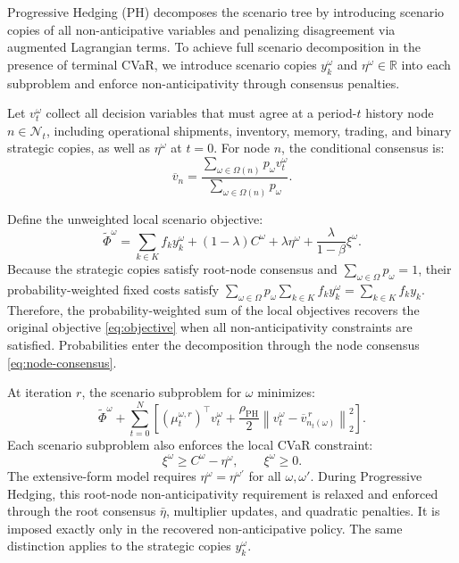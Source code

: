 \documentclass[11pt,a4paper]{article}
\newcommand{\R}{\mathbb{R}}
\begin{document}
Progressive Hedging (PH) decomposes the scenario tree by introducing
scenario copies of all non-anticipative variables and penalizing
disagreement via augmented Lagrangian terms. To achieve full scenario
decomposition in the presence of terminal CVaR, we introduce scenario
copies \(y_k^\omega\) and \(\eta^\omega\in\R\) into each subproblem and
enforce non-anticipativity through consensus penalties.

Let \(v_t^\omega\) collect all decision variables that must agree at a
period-\(t\) history node \(n\in\mathcal{N}_t\), including operational
shipments, inventory, memory, trading, and binary strategic copies, as
well as \(\eta^\omega\) at \(t=0\). For node \(n\), the conditional
consensus is:
\begin{equation}
  \overline{v}_n
  =
  \frac{
    \sum_{\omega\in\Omega(n)}p_\omega v_t^\omega
  }{
    \sum_{\omega\in\Omega(n)}p_\omega
  }.
  \label{eq:node-consensus}
\end{equation}

Define the unweighted local scenario objective:
\begin{equation}
  \widetilde\Phi^\omega
  =
  \sum_{k\in K}f_ky_k^\omega
  +
  (1-\lambda)C^\omega
  +
  \lambda\eta^\omega
  +
  \frac{\lambda}{1-\beta}\xi^\omega.
  \label{eq:scenario-contribution}
\end{equation}
Because the strategic copies satisfy root-node consensus and
\(\sum_{\omega\in\Omega}p_\omega=1\), their probability-weighted fixed
costs satisfy
\(\sum_{\omega\in\Omega}p_\omega\sum_{k\in K}f_ky_k^\omega=\sum_{k\in K}f_ky_k\).
Therefore, the probability-weighted sum of the local objectives
recovers the original objective \cref{eq:objective} when all
non-anticipativity constraints are satisfied. Probabilities enter the
decomposition through the node consensus \cref{eq:node-consensus}.

At iteration \(r\), the scenario subproblem for \(\omega\) minimizes:
\begin{equation}
  \widetilde\Phi^\omega
  +
  \sum_{t=0}^{N}\left[
    (\mu_t^{\omega,r})^\top v_t^\omega
    +
    \frac{\rho_{\mathrm{PH}}}{2}
    \left\|v_t^\omega-\overline{v}_{n_t(\omega)}^{\,r}\right\|_2^2
  \right].
  \label{eq:ph-penalty}
\end{equation}
Each scenario subproblem also enforces the local CVaR constraint:
\begin{equation}
  \xi^\omega\geq C^\omega-\eta^\omega,
  \qquad
  \xi^\omega\geq0.
  \label{eq:ph-cvar-local}
\end{equation}
The extensive-form model requires
\(\eta^\omega=\eta^{\omega'}\) for all \(\omega,\omega'\).
During Progressive Hedging, this root-node non-anticipativity
requirement is relaxed and enforced through the root consensus
\(\bar\eta\), multiplier updates, and quadratic penalties. It is imposed
exactly only in the recovered non-anticipative policy.
The same distinction applies to the strategic copies \(y_k^\omega\).
\end{document}

